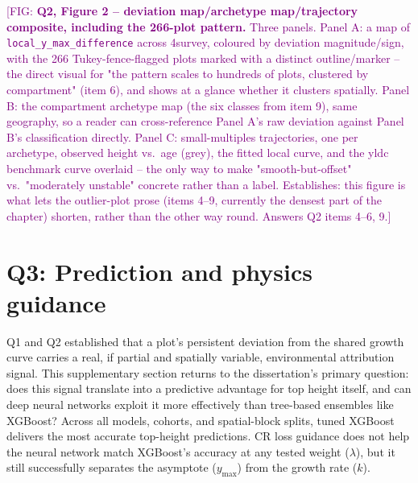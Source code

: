 \documentclass[logo,msc,ai]{infthesis}           %
\newcommand{\fig}[1]{\textcolor{purple}{[FIG: #1]}}
\begin{document}
\fig{\textbf{Q2, Figure 2 -- deviation map/archetype map/trajectory composite,
including the 266-plot pattern.} Three panels. Panel A: a map of
\texttt{local\_y\_max\_difference} across 4survey, coloured by deviation
magnitude/sign, with the 266 Tukey-fence-flagged plots marked with a distinct
outline/marker -- the direct visual for "the pattern scales to hundreds of plots,
clustered by compartment" (item 6), and shows at a glance whether it clusters
spatially. Panel B: the compartment archetype map (the six classes from item 9), same
geography, so a reader can cross-reference Panel A's raw deviation against Panel B's
classification directly. Panel C: small-multiples trajectories, one per archetype,
observed height vs.\ age (grey), the fitted local curve, and the yldc benchmark curve
overlaid -- the only way to make "smooth-but-offset" vs.\ "moderately unstable"
concrete rather than a label. Establishes: this figure is what lets the outlier-plot
prose (items 4--9, currently the densest part of the chapter) shorten, rather than the
other way round. Answers Q2 items 4--6, 9.}




\section{Q3: Prediction and physics guidance}
\label{sec:results-q3}
Q1 and Q2 established that a plot's persistent deviation from the shared growth curve carries a real, if partial and spatially variable, environmental attribution signal. This supplementary section returns to the dissertation's primary question: does this signal translate into a predictive advantage for top height itself, and can deep neural networks exploit it more effectively than tree-based ensembles like XGBoost? Across all models, cohorts, and spatial-block splits, tuned XGBoost delivers the most accurate top-height predictions. CR loss guidance does not help the neural network match XGBoost's accuracy at any tested weight ($\lambda$), but it still successfully separates the asymptote ($y_{\max}$) from the growth rate ($k$).
\end{document}
